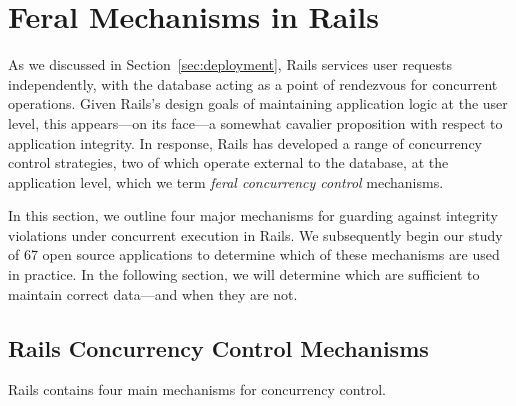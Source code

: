 
\section{Feral Mechanisms in Rails}
\label{sec:rails-cc}

As we discussed in Section~\ref{sec:deployment}, Rails services user
requests independently, with the database acting as a point
of rendezvous for concurrent operations. Given Rails's design goals of
maintaining application logic at the user level, this appears---on its
face---a somewhat cavalier proposition with respect to application
integrity. In response, Rails has developed a range of concurrency
control strategies, two of which operate external to the database, at
the application level, which we term \textit{feral concurrency
  control} mechanisms.

In this section, we outline four major mechanisms for guarding against
integrity violations under concurrent execution in Rails. We
subsequently begin our study of 67 open source applications to
determine which of these mechanisms are used in practice. In the following
section, we will determine which are sufficient to maintain
correct data---and when they are not.

\subsection{Rails Concurrency Control Mechanisms}

Rails contains four main mechanisms for concurrency control.

